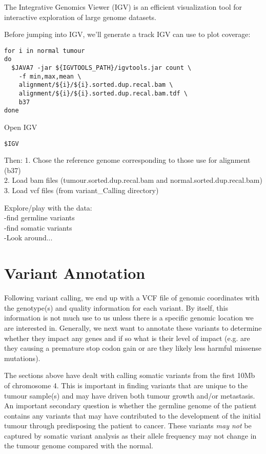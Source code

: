 The Integrative Genomics Viewer (IGV) is an efficient visualization tool for interactive exploration of large genome datasets. 

Before jumping into IGV, we'll generate a track IGV can use to plot coverage:


\begin{lstlisting}
for i in normal tumour
do
  $JAVA7 -jar ${IGVTOOLS_PATH}/igvtools.jar count \
    -f min,max,mean \
    alignment/${i}/${i}.sorted.dup.recal.bam \
    alignment/${i}/${i}.sorted.dup.recal.bam.tdf \
    b37
done
\end{lstlisting}

Open IGV
\begin{lstlisting}
$IGV
\end{lstlisting}

Then:
   1. Chose the reference genome corresponding to those use for alignment (b37) \\
   2. Load bam files (tumour.sorted.dup.recal.bam and normal.sorted.dup.recal.bam) \\
   3. Load vcf files (from variant\_Calling directory)

Explore/play with the data: \\ 
   -find germline variants \\
   -find somatic variants \\
   -Look around...

\newpage


\section{Variant Annotation}

Following variant calling, we end up with a VCF file of genomic coordinates with the genotype(s) and quality information for each variant. By itself, this information is not much use to us unless there is a specific genomic location we are interested in. Generally, we next want to annotate these variants to determine whether they impact any genes and if so what is their level of impact (e.g. are they causing a premature stop codon gain or are they likely less harmful missense mutations).

The sections above have dealt with calling somatic variants from the first 10Mb of chromosome 4. This is important in finding variants that are unique to the tumour sample(s) and may have driven both tumour growth and/or metastasis. An important secondary question is whether the germline genome of the patient contains any variants that may have contributed to the development of the initial tumour through predisposing the patient to cancer. These variants \textit{may not} be captured by somatic variant analysis as their allele frequency may not change in the tumour genome compared with the normal.

